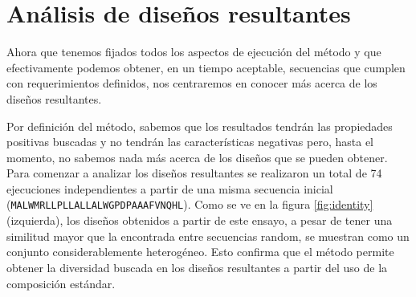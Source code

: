 \section{Análisis de diseños resultantes}

Ahora que tenemos fijados todos los aspectos de ejecución del método y que efectivamente podemos obtener, en un tiempo aceptable, secuencias que cumplen con requerimientos definidos, nos centraremos en 
conocer más acerca de los diseños resultantes.



Por definición del método, sabemos que los resultados tendrán las propiedades positivas buscadas y no tendrán las características negativas pero, hasta el momento, no sabemos nada más acerca de los diseños que se pueden obtener.
Para comenzar a analizar los diseños resultantes se realizaron un total de 74 ejecuciones independientes a partir de una misma secuencia inicial (\texttt{MALWMRLLPLLALLALWGPDPAAAFVNQHL}).
Como se ve en la figura \ref{fig:identity} (izquierda), los diseños obtenidos a partir de este ensayo, a pesar de tener una similitud mayor que la encontrada entre secuencias random, se 
muestran como un conjunto considerablemente heterogéneo. Esto confirma que el método permite obtener la diversidad buscada en los diseños resultantes a partir del uso de la composición estándar.

